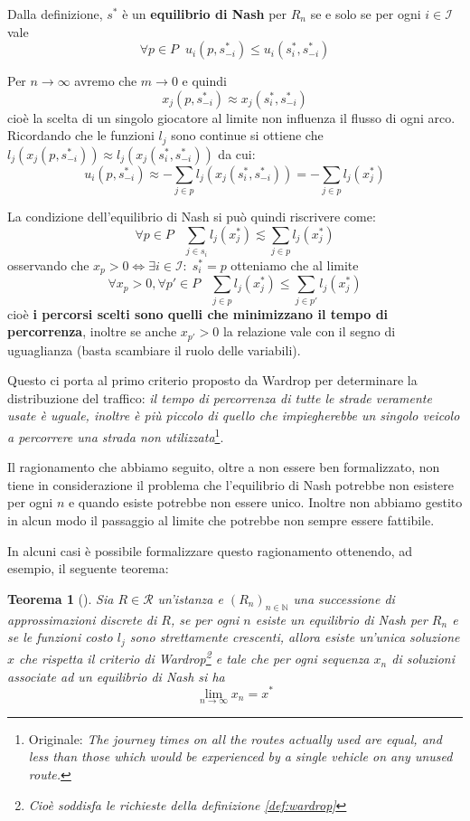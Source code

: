 \documentclass[a4paper]{article}
\theoremstyle{plain}
\newtheorem{myteo}{Teorema}[section]
\theoremstyle{definition}
\theoremstyle{remark}
\newcommand{\pa}[1]{\left(#1\right)}
\begin{document}
Dalla definizione, $s^*$ è un \textbf{equilibrio di Nash} per $R_n$ se
e solo se per ogni $i\in \mathcal{I}$ vale
\[ \forall p\in P \;\; u_i \pa{p,s^*_{-i}} \le u_i\pa{s^*_i,s^*_{-i}} \]

Per $n \to \infty$ avremo che $m\to 0$ e quindi
\[ x_j\pa{p, s^*_{-i}} \approx x_j\pa{s^*_i, s^*_{-i}} \]
cioè la scelta di un singolo giocatore al limite non influenza il
flusso di ogni arco. Ricordando che le funzioni $l_j$ sono continue si
ottiene che
$l_j\pa{x_j\pa{p, s^*_{-i}}} \approx l_j\pa{x_j\pa{s^*_i, s^*_{-i}}}$
da cui:
\[ u_i\pa{p, s^*_{-i}} \approx - \sum_{j\in p} l_j\pa{x_j\pa{s^*_i,
      s^*_{-i}}} = -\sum _{j\in p}l_j\pa{x^*_j} \]

La condizione dell'equilibrio di Nash si può quindi riscrivere come:
\[ \forall p\in P\;\;\; \sum _{j\in s_i}l_j\pa{x^*_j} \lesssim \sum
  _{j\in p}l_j\pa{x^*_j} \]
osservando che
$x_p > 0 \Leftrightarrow \exists i\in \mathcal{I}:\; s^*_i = p$
otteniamo che al limite
\[ \forall x_p >0, \forall p'\in P \;\;\; \sum _{j\in p}l_j\pa{x^*_j}
  \le \sum _{j\in p'}l_j\pa{x^*_j} \]
cioè \textbf{i percorsi scelti sono quelli che minimizzano il tempo di
  percorrenza}, inoltre se anche $x_{p'} > 0$ la relazione vale con il
segno di uguaglianza (basta scambiare il ruolo delle variabili).

Questo ci porta al primo criterio proposto da
Wardrop\cite[pag. 345]{wardrop1952} per determinare la distribuzione
del traffico: \textit{il tempo di percorrenza di tutte le strade
  veramente usate è uguale, inoltre è più piccolo di quello che
  impiegherebbe un singolo veicolo a percorrere una strada non
  utilizzata}\footnote{Originale: \textit{The journey times on all the
    routes actually used are equal, and less than those which would be
    experienced by a single vehicle on any unused route.}}.

Il ragionamento che abbiamo seguito, oltre a non essere ben
formalizzato, non tiene in considerazione il problema che l'equilibrio
di Nash potrebbe non esistere per ogni $n$ e quando esiste potrebbe
non essere unico. Inoltre non abbiamo gestito in alcun modo il
passaggio al limite che potrebbe non sempre essere fattibile.

In alcuni casi è possibile formalizzare questo ragionamento ottenendo,
ad esempio, il seguente teorema:
\begin{myteo}[{\cite[Teorema 3.2]{haurie1985}}]
  Sia $R\in \mathcal{R}$ un'istanza e $\pa{R_n}_{n\in \mathbb{N}}$ una
  successione di approssimazioni discrete di $R$, se per ogni $n$
  esiste un equilibrio di Nash per $R_n$ e se le funzioni costo $l_j$
  sono strettamente crescenti, allora esiste un'unica soluzione $x$
  che rispetta il criterio di Wardrop\footnote{Cioè soddisfa le
    richieste della definizione \ref{def:wardrop}} e tale che per ogni
  sequenza $x_n$ di soluzioni associate ad un equilibrio di Nash si ha
  \[ \lim _{n\to \infty} x_n = x^* \]
\end{myteo}
\end{document}
